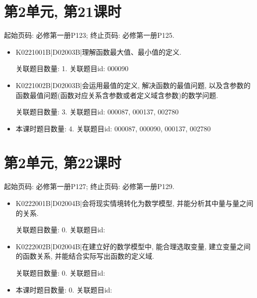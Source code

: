 \section*{第2单元, 第21课时}
起始页码: 必修第一册P123; 终止页码: 必修第一册P125.
\begin{itemize}
\item K0221001B|D02003B|理解函数最大值、最小值的定义.

关联题目数量: 1. 关联题目id: 000090

\item K0221002B|D02003B|会运用最值的定义, 解决函数的最值问题, 以及含参数的函数最值问题(函数对应关系含参数或者定义域含参数)的数学问题.

关联题目数量: 3. 关联题目id: 000087, 000137, 002780

\item 本课时题目数量: 4. 关联题目id: 000087, 000090, 000137, 002780

\end{itemize}

\section*{第2单元, 第22课时}
起始页码: 必修第一册P127; 终止页码: 必修第一册P129.
\begin{itemize}
\item K0222001B|D02004B|会将现实情境转化为数学模型, 并能分析其中量与量之间的关系.

关联题目数量: 0. 关联题目id: 

\item K0222002B|D02004B|在建立好的数学模型中, 能合理选取变量, 建立变量之间的函数关系, 并能结合实际写出函数的定义域.

关联题目数量: 0. 关联题目id: 

\item 本课时题目数量: 0. 关联题目id: 

\end{itemize}

